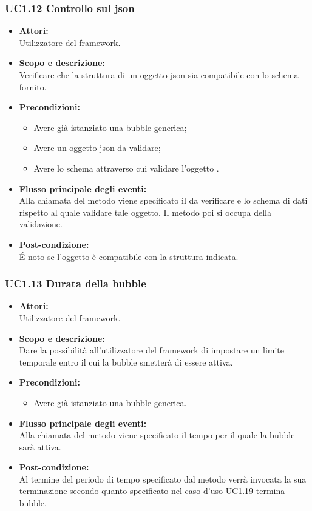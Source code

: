 \subsubsection{UC1.12 Controllo sul json} \label{UC1.12}

\begin{itemize}
	\item \textbf{Attori:}
	\\Utilizzatore del framework.
	\item \textbf{Scopo e descrizione:} 
	\\Verificare che la struttura di un oggetto json sia compatibile con lo schema fornito.
	\item \textbf{Precondizioni:}
	\begin{itemize}
		\item Avere già istanziato una bubble generica;
		\item Avere un oggetto json da validare;
		\item Avere lo schema attraverso cui validare l’oggetto .
	\end{itemize}
	\item \textbf{Flusso principale degli eventi:}
	\\Alla chiamata del metodo viene specificato il  da verificare e lo schema di dati rispetto al quale validare tale oggetto. Il metodo poi si occupa della validazione.
	\item \textbf{Post-condizione:}
	\\É noto se l'oggetto  è compatibile con la struttura indicata.
\end{itemize}

\subsubsection{UC1.13 Durata della bubble} \label{UC1.13}

\begin{itemize}
	\item \textbf{Attori:}
	\\Utilizzatore del framework.
	\item \textbf{Scopo e descrizione:} 
	\\Dare la possibilità all'utilizzatore del framework di impostare un limite temporale entro il cui la bubble smetterà di essere attiva.
	\item \textbf{Precondizioni:}
	\begin{itemize}
		\item Avere già istanziato una bubble generica.
	\end{itemize}
	\item \textbf{Flusso principale degli eventi:}
	\\Alla chiamata del metodo viene specificato il tempo per il quale la bubble sarà attiva.
	\item \textbf{Post-condizione:}
	\\Al termine del periodo di tempo specificato dal metodo verrà invocata la sua terminazione secondo quanto specificato nel caso d’uso \hyperref[UC1.19]{UC1.19} termina bubble.
\end{itemize}

